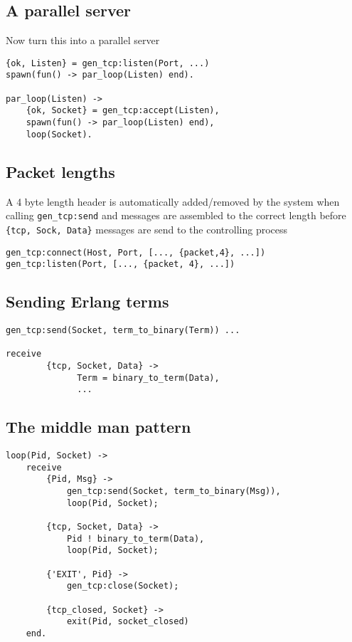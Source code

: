 \documentclass[12pt]{article}
\begin{document}
\subsection{A parallel server}

Now turn this into a parallel server

\begin{verbatim}
{ok, Listen} = gen_tcp:listen(Port, ...)
spawn(fun() -> par_loop(Listen) end).

par_loop(Listen) ->
    {ok, Socket} = gen_tcp:accept(Listen),
    spawn(fun() -> par_loop(Listen) end),
    loop(Socket).
\end{verbatim}

\subsection{Packet lengths}

A 4 byte length header is automatically added/removed by the system
when calling \verb+gen_tcp:send+ and messages are assembled to the
correct length before \verb+{tcp, Sock, Data}+ messages are send to
the controlling process

\begin{verbatim}
gen_tcp:connect(Host, Port, [..., {packet,4}, ...])
gen_tcp:listen(Port, [..., {packet, 4}, ...])
\end{verbatim}


\subsection{Sending Erlang terms}

\begin{verbatim}
gen_tcp:send(Socket, term_to_binary(Term)) ...

receive
        {tcp, Socket, Data} ->
              Term = binary_to_term(Data),
              ...
\end{verbatim}

\subsection{The middle man pattern}

\begin{verbatim}
loop(Pid, Socket) ->
    receive
        {Pid, Msg} ->
            gen_tcp:send(Socket, term_to_binary(Msg)),
            loop(Pid, Socket);
            
        {tcp, Socket, Data} ->
            Pid ! binary_to_term(Data),
            loop(Pid, Socket);
            
        {'EXIT', Pid} ->
            gen_tcp:close(Socket);
            
        {tcp_closed, Socket} ->
            exit(Pid, socket_closed)
    end.
\end{verbatim}
\end{document}
